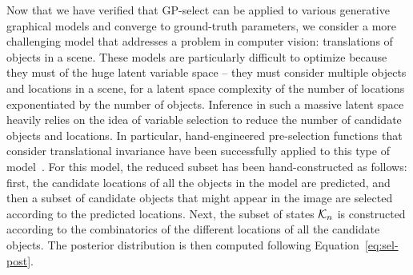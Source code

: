 Now that we have verified that GP-select can be applied to various generative graphical models and converge to ground-truth parameters, we consider a more challenging model that addresses a problem in computer vision: translations of objects in a scene.
%
These models are particularly difficult to optimize because they must of the huge latent variable space -- they must consider multiple objects and locations in a scene, for a latent space complexity of the number of locations exponentiated by the number of objects.
Inference in such a massive latent space heavily relies on the idea of variable selection to reduce the number of candidate objects and locations. In particular, hand-engineered pre-selection functions that consider translational invariance have been successfully applied to this type of model~\citep{DaiLucke2012b,DaiLucke2014,DaiEtAl2013}.
%
For this model, the reduced subset has been hand-constructed as follows: first, the candidate locations of all the objects in the model are predicted, and then a subset of candidate objects that might appear in the image are selected according to the predicted locations.  Next, the subset of states $\mathcal{K}_{n}$ is constructed according to the combinatorics of the different locations of all the candidate objects.
The posterior distribution is then computed following Equation~\eqref{eq:sel-post}.

